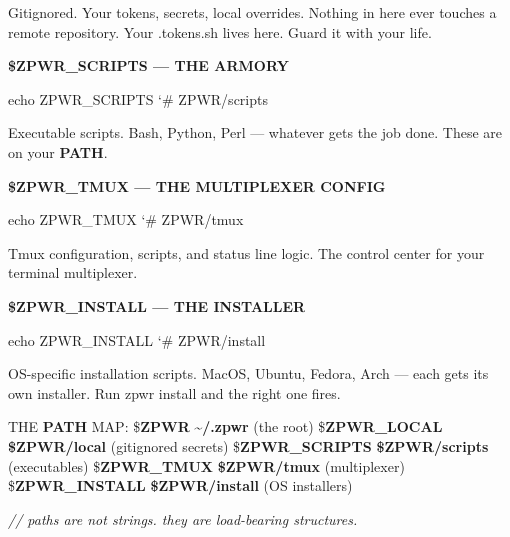 \documentclass[11pt,a4paper,twoside]{book}
\begin{document}
Gitignored. Your tokens, secrets, local overrides. Nothing in here ever touches a remote repository. Your .tokens.sh lives here. Guard it with your life.


\vspace{12pt}
{\bfseries\color{neonyellow} \$\textbf{ZPWR\_SCRIPTS} — THE ARMORY}\vspace{4pt}

\begin{codebox}
\color{neongreen}echo ZPWR\_SCRIPTS   {\char`\#} ZPWR/scripts\\
\end{codebox}

Executable scripts. Bash, Python, Perl — whatever gets the job done. These are on your \textbf{PATH}.


\vspace{12pt}
{\bfseries\color{neonyellow} \$\textbf{ZPWR\_TMUX} — THE MULTIPLEXER CONFIG}\vspace{4pt}

\begin{codebox}
\color{neongreen}echo ZPWR\_TMUX   {\char`\#} ZPWR/tmux\\
\end{codebox}

Tmux configuration, scripts, and status line logic. The control center for your terminal multiplexer.


\vspace{12pt}
{\bfseries\color{neonyellow} \$\textbf{ZPWR\_INSTALL} — THE INSTALLER}\vspace{4pt}

\begin{codebox}
\color{neongreen}echo ZPWR\_INSTALL   {\char`\#} ZPWR/install\\
\end{codebox}

OS-specific installation scripts. MacOS, Ubuntu, Fedora, Arch — each gets its own installer. Run zpwr install and the right one fires.

THE \textbf{PATH} MAP: \$\textbf{ZPWR}                \textbf{\textasciitilde{}/.zpwr} (the root) \$\textbf{ZPWR\_LOCAL}          \textbf{\$ZPWR/local} (gitignored secrets) \$\textbf{ZPWR\_SCRIPTS}        \textbf{\$ZPWR/scripts} (executables) \$\textbf{ZPWR\_TMUX}           \textbf{\$ZPWR/tmux} (multiplexer) \$\textbf{ZPWR\_INSTALL}        \textbf{\$ZPWR/install} (OS installers)

{\small\itshape\color{dimtext} // paths are not strings. they are load-bearing structures.}
\end{document}
